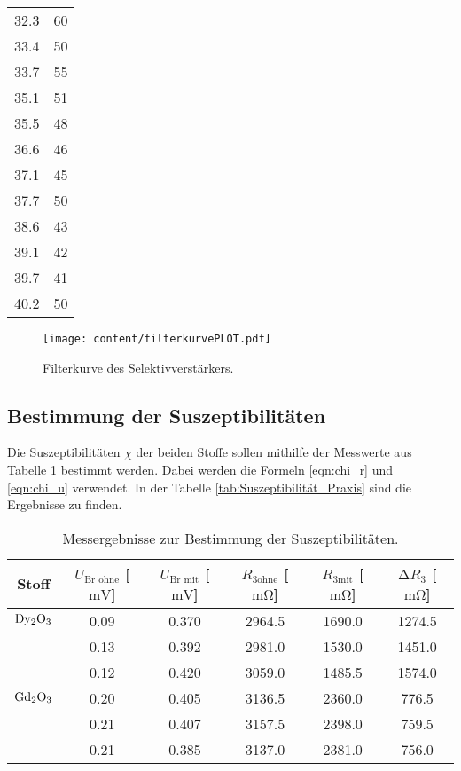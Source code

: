\begin{table}
\begin{tabular}{c c}
      32.3   & 60 \\
      33.4   & 50 \\
      33.7   & 55 \\
      35.1   & 51 \\
      35.5   & 48 \\
      36.6   & 46 \\
      37.1   & 45 \\
      37.7   & 50 \\
      38.6   & 43 \\
      39.1   & 42 \\
      39.7   & 41 \\
      40.2   & 50 \\
    \bottomrule
  \end{tabular}
\end{table}

\begin{figure}
  \centering
  \caption{Filterkurve des Selektivverstärkers.}
  \label{fig:filterkurvePLOT}
  \texttt{[image: content/filterkurvePLOT.pdf]}
\end{figure}

\subsection{Bestimmung der Suszeptibilitäten}
\label{subsec:Suszeptibilität}

Die Suszeptibilitäten $\chi$ der beiden Stoffe sollen mithilfe der Messwerte aus Tabelle \ref{tab:Messwerte} bestimmt werden.
Dabei werden die Formeln \eqref{eqn:chi_r} und \eqref{eqn:chi_u} verwendet.
In der Tabelle \ref{tab:Suszeptibilität_Praxis} sind die Ergebnisse zu finden.

\begin{table}
  \centering
  \caption{Messergebnisse zur Bestimmung der Suszeptibilitäten.}
  \label{tab:Messwerte}
  \begin{tabular}{c c c c c c}
    \toprule
    {Stoff} & {$U_{\text{Br ohne}}$ [$\si{\milli\volt}$]} & {$U_{\text{Br mit}}$ [$\si{\milli\volt}$]} & {$R_{3 \text{ohne}}$ [$\si{\milli\ohm}$]} &{$R_{3 \text{mit}}$ [$\si{\milli\ohm}$]} & {$\increment R_3$ [$\si{\milli\ohm}$]}\\
    \midrule
    $\ce{Dy2O3}$ & 0.09 & 0.370 & 2964.5 & 1690.0 & 1274.5\\
              &0.13 & 0.392 & 2981.0 & 1530.0 & 1451.0\\
              &0.12 & 0.420 & 3059.0 & 1485.5 & 1574.0\\
    $\ce{Gd2O3}$ &0.20 & 0.405 & 3136.5 & 2360.0 & 776.5\\
              &0.21 & 0.407 & 3157.5 & 2398.0 & 759.5\\
              &0.21 & 0.385 & 3137.0 & 2381.0 & 756.0\\
    \bottomrule
  \end{tabular}
\end{table}

